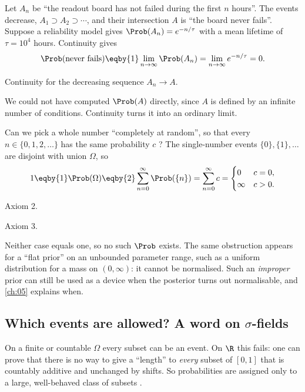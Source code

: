 \label{1a:ex:alive}
Let $A_n$ be ``the readout board has not failed during the first $n$ hours''.
The events decrease, $A_1\supset A_2\supset\cdots$, and their intersection $A$ is
``the board never fails''. Suppose a reliability model gives
$\Prob(A_n)=e^{-n/\tau}$ with a mean lifetime of $\tau=10^4$ hours. Continuity gives
\begin{align*}
\Prob(\text{never fails})\eqby{1}\lim_{n\to\infty}\Prob(A_n)=\lim_{n\to\infty}e^{-n/\tau}=0 .
\end{align*}
\begin{explain}
  \item Continuity for the decreasing sequence $A_n\to A$.
\end{explain}
We could not have computed $\Prob(A)$ directly, since $A$ is defined by an
infinite number of conditions. Continuity turns it into an ordinary limit.

\label{1a:ex:no-uniform-N}
Can we pick a whole number ``completely at random'', so that every
$n\in\{0,1,2,\dots\}$ has the same probability $c$ ? The
single-number events $\{0\},\{1\},\dots$ are disjoint with union $\Omega$, so
\begin{align*}
1\eqby{1}\Prob(\Omega)\eqby{2}\sum_{n=0}^\infty\Prob(\{n\})=\sum_{n=0}^\infty c
=\begin{cases}0 & c=0,\\ \infty & c>0.\end{cases}
\end{align*}
\begin{explain}
  \item Axiom 2.
  \item Axiom 3.
\end{explain}
Neither case equals one, so no such $\Prob$ exists. The same obstruction
appears for a ``flat prior'' on an unbounded parameter range, such as a
uniform distribution for a mass on $(0,\infty)$: it cannot be normalised.
Such an \emph{improper} prior can still be used as a device when the
posterior turns out normalisable, and \cref{ch:05} explains when.

\subsection{Which events are allowed? A word on $\sigma$-fields}
\label{1a:sub:sigma}

On a finite or countable $\Omega$ every subset can be an event. On $\R$ this
fails: one can prove that there is no way to give a ``length'' to
\emph{every} subset of $[0,1]$ that is countably additive and unchanged by
shifts. So probabilities are assigned only to a large, well-behaved class of
subsets .

